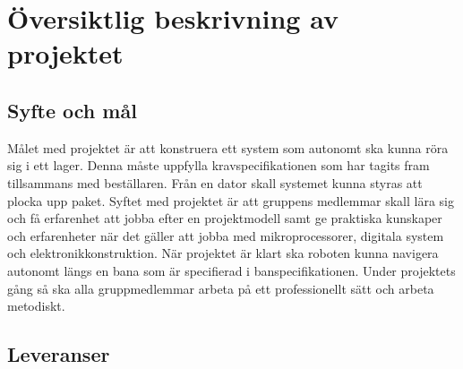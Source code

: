 \section{Översiktlig beskrivning av projektet}


\subsection{Syfte och mål}
Målet med projektet är att konstruera ett system som autonomt ska kunna röra sig i ett lager. Denna måste uppfylla kravspecifikationen som har tagits fram tillsammans med beställaren. Från en dator skall systemet kunna styras att plocka upp paket. Syftet med projektet är att gruppens medlemmar skall lära sig och få erfarenhet att jobba efter en projektmodell samt ge praktiska kunskaper och erfarenheter när det gäller att jobba med mikroprocessorer, digitala system och elektronikkonstruktion. När projektet är klart ska roboten kunna navigera autonomt längs en bana som är specifierad i banspecifikationen. 
Under projektets gång så ska alla gruppmedlemmar arbeta på ett professionellt sätt och arbeta metodiskt. 

\subsection{Leveranser}

